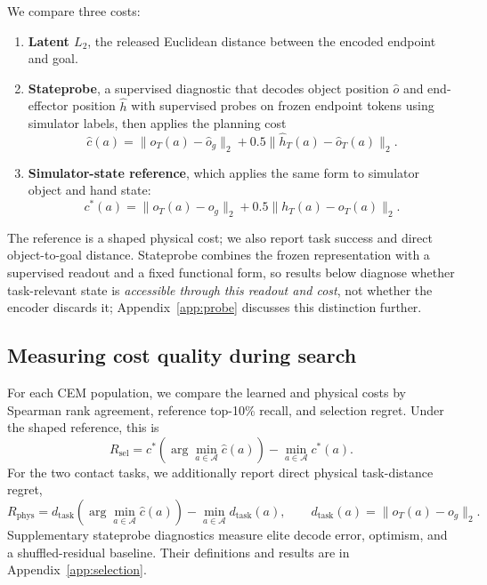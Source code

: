 \documentclass[10pt]{article}
\begin{document}
We compare three costs:
\begin{enumerate}
  \item \textbf{Latent $L_2$}, the released Euclidean distance between the
  encoded endpoint and goal.
  \item \textbf{Stateprobe}, a supervised diagnostic that decodes
  object position $\hat o$ and end-effector position $\hat h$ with
  supervised probes on frozen
  endpoint tokens using simulator labels, then applies the planning cost
  \begin{equation}
    \hat c(a)=\|\hat o_T(a)-\hat o_g\|_2+
       0.5\|\hat h_T(a)-\hat o_T(a)\|_2.
  \end{equation}
  \item \textbf{Simulator-state reference}, which applies the same form to
  simulator object and hand state:
  \begin{equation}
    \label{eq:state-reference}
    c^*(a)=\|o_T(a)-o_g\|_2+
       0.5\|h_T(a)-o_T(a)\|_2.
  \end{equation}
\end{enumerate}
The reference is a shaped physical cost; we also report task success and direct
object-to-goal distance. Stateprobe combines the frozen representation with a
supervised readout and a fixed functional form, so results below diagnose
whether task-relevant state is \emph{accessible through this readout and
cost}, not whether the encoder discards it; Appendix~\ref{app:probe}
discusses this distinction further.

\subsection{Measuring cost quality during search}

For each CEM population, we compare the learned and physical costs by Spearman
rank agreement, reference top-10\% recall, and selection regret. Under the
shaped reference, this is
\begin{equation}
 R_{\mathrm{sel}} =
 c^*\!\left(\arg\min_{a\in\mathcal A}\hat c(a)\right)
 - \min_{a\in\mathcal A}c^*(a).
\end{equation}
For the two contact tasks, we additionally report direct physical task-distance
regret,
\begin{equation}
 R_{\mathrm{phys}} =
 d_{\mathrm{task}}\!\left(\arg\min_{a\in\mathcal A}\hat c(a)\right)
 - \min_{a\in\mathcal A}d_{\mathrm{task}}(a), \qquad
 d_{\mathrm{task}}(a)=\|o_T(a)-o_g\|_2.
\end{equation}
Supplementary stateprobe diagnostics measure elite decode error, optimism, and
a shuffled-residual baseline. Their definitions and results are in
Appendix~\ref{app:selection}.
\end{document}
